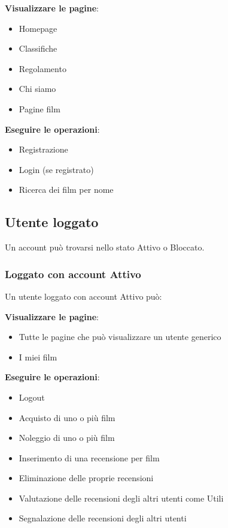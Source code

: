 \documentclass[a4paper]{article}
\begin{document}
    \noindent\textbf{Visualizzare le pagine}:
        \begin{itemize}
            \item Homepage
            \item Classifiche
            \item Regolamento
            \item Chi siamo
            \item Pagine film
        \end{itemize}
    \textbf{Eseguire le operazioni}:
        \begin{itemize}
            \item Registrazione
            \item Login (se registrato)
            \item Ricerca dei film per nome
        \end{itemize}
\subsection{Utente loggato}
    Un account pu\`o trovarsi nello stato Attivo o Bloccato.
    \subsubsection{Loggato con account Attivo}
    Un utente loggato con account Attivo pu\`o:

    \noindent\textbf{Visualizzare le pagine}:
    \begin{itemize}
        \item Tutte le pagine che pu\`o visualizzare un utente generico
        \item I miei film
    \end{itemize}
    \textbf{Eseguire le operazioni}:
    \begin{itemize}
        \item Logout
        \item Acquisto di uno o pi\`u film
        \item Noleggio di uno o pi\`u film
        \item Inserimento di una recensione per film
        \item Eliminazione delle proprie recensioni
        \item Valutazione delle recensioni degli altri utenti come Utili
        \item Segnalazione delle recensioni degli altri utenti
    \end{itemize}
\end{document}
